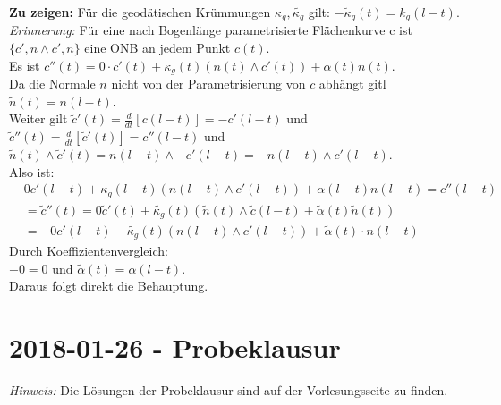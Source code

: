 \begin{problem*}[3]
\textbf{Zu zeigen:} Für die geodätischen Krümmungen $\kappa_g, \tilde{\kappa_g}$ gilt: $-\tilde{ \kappa }_g(t) = k_g(l-t)$.\\
\emph{Erinnerung:} Für eine nach Bogenlänge parametrisierte Flächenkurve c ist $\{ c', n \land c', n \}$ eine ONB an jedem Punkt $c(t)$. \\
Es ist $c''(t) = 0 \cdot c'(t) + \kappa_g(t)(n(t) \land c'(t)) + \alpha(t) n(t)$. \\
Da die Normale $ n $ nicht von der Parametrisierung von $ c $ abhängt gitl $\tilde{ n }(t) = n(l-t)$. \\
Weiter gilt $ \tilde{ c }'(t) = \frac{d}{dt}[c(l-t)] = - c'(l-t)$ und \\
$\tilde{ c }''(t) = \frac{d}{dt}[\tilde{ c }'(t)] = c''(l-t)$ und \\
$\tilde{ n }(t) \land \tilde{ c }'(t) = n(l-t) \land - c'(l-t) = -n (l-t) \land c'(l-t)$. \\
Also ist:
\begin{align*}
& 0c'(l-t) + \kappa_g(l-t)(n(l-t) \land c'(l-t)) + \alpha(l-t)n(l-t) = c''(l-t) \\
&= \tilde{ c }''(t) = 0\tilde{ c }'(t) + \tilde{\kappa_g}(t)(\tilde{ n }(t) \land \tilde{c}(l-t) + \tilde{\alpha}(t) \tilde{n}(t)) \\
&= -0 c'(l-t) - \tilde{\kappa_g}(t)(n(l-t) \land c'(l-t)) + \tilde{ \alpha }(t) \cdot n(l-t)
\end{align*}
Durch Koeffizientenvergleich: \\
$-0 = 0 \text{ und } \tilde{ \alpha }(t) = \alpha(l-t)$.\\
Daraus folgt direkt die Behauptung.
\end{problem*}

\section{2018-01-26 - Probeklausur} %
\label{sec:2018_01_26_probeklausur}
\emph{Hinweis:} Die Lösungen der Probeklausur sind auf der Vorlesungsseite zu finden.


